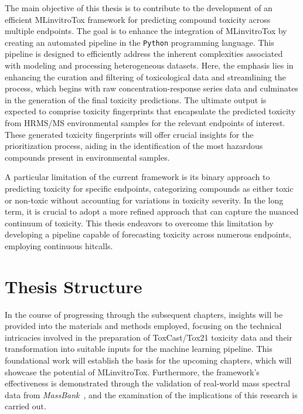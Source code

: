 The main objective of this thesis is to contribute to the development of an efficient MLinvitroTox framework for predicting compound toxicity across multiple endpoints. The goal is to enhance the integration of MLinvitroTox by creating an automated pipeline in the \texttt{Python} programming language. This pipeline is designed to efficiently address the inherent complexities associated with modeling and processing heterogeneous datasets. Here, the emphasis lies in enhancing the curation and filtering of toxicological data and streamlining the process, which begins with raw concentration-response series data and culminates in the generation of the final toxicity predictions. The ultimate output is expected to comprise toxicity fingerprints that encapsulate the predicted toxicity from HRMS/MS environmental samples for the relevant endpoints of interest. These generated toxicity fingerprints will offer crucial insights for the prioritization process, aiding in the identification of the most hazardous compounds present in environmental samples.

A particular limitation of the current framework is its binary approach to predicting toxicity for specific endpoints, categorizing compounds as either toxic or non-toxic without accounting for variations in toxicity severity. In the long term, it is crucial to adopt a more refined approach that can capture the nuanced continuum of toxicity. This thesis endeavors to overcome this limitation by developing a pipeline capable of forecasting toxicity across numerous endpoints, employing continuous hitcalls.




\section{Thesis Structure}

In the course of progressing through the subsequent chapters, insights will be provided into the materials and methods employed, focusing on the technical intricacies involved in the preparation of ToxCast/Tox21 toxicity data and their transformation into suitable inputs for the machine learning pipeline. This foundational work will establish the basis for the upcoming chapters, which will showcase the potential of MLinvitroTox. Furthermore, the framework's effectiveness is demonstrated through the validation of real-world mass spectral data from \emph{MassBank}~\cite{massbank}, and the examination of the implications of this research is carried out.
